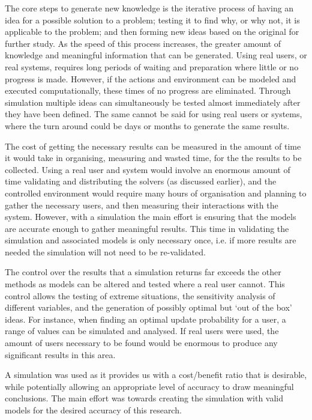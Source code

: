 The core steps to generate new knowledge is the iterative process of having an idea for a possible solution to a problem; 
testing it to find why, or why not, it is applicable to the problem;
and then forming new ideas based on the original for further study.
As the speed of this process increases, the greater amount of knowledge and meaningful information that can be generated. 
Using real users, or real systems, requires long periods of waiting and preparation where little or no progress is made.
However, if the actions and environment can be modeled and executed computationally, these times of no progress are eliminated.
Through simulation multiple ideas can simultaneously be tested almost immediately after they have been defined.
The same cannot be said for using real users or systems, where the turn around could be days or months to generate the same results.  

The cost of getting the necessary results can be measured in the amount of time it would take in organising, measuring and wasted time, for the the results to be collected.
Using a real user and system would involve an enormous amount of time validating and distributing the solvers (as discussed earlier), 
and the controlled environment would require many hours of organisation and planning to gather the necessary users, and then measuring their interactions with the system.
However, with a simulation the main effort is ensuring that the models are accurate enough to gather meaningful results.
This time in validating the simulation and associated models is only necessary once, 
i.e. if more results are needed the simulation will not need to be re-validated.

The control over the results that a simulation returns far exceeds the other methods as models can be altered and tested where a real user cannot. 
This control allows the testing of extreme situations, the sensitivity analysis of different variables,
and the generation of possibly optimal but `out of the box' ideas. 
For instance, when finding an optimal update probability for a user, a range of values can be simulated and analysed.
If real users were used, the amount of users necessary to be found would be enormous to produce any significant results in this area.

A simulation was used as it provides us with a cost/benefit ratio that is desirable, while potentially allowing an appropriate level of accuracy to draw meaningful conclusions.
The main effort was towards creating the simulation with valid models for the desired accuracy of this research.

